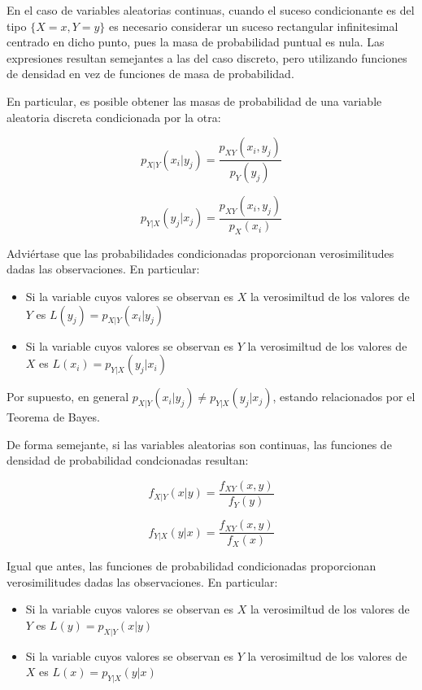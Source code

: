\documentclass[11pt]{article}
\providecommand{\tightlist}{%
      \setlength{\itemsep}{0pt}\setlength{\parskip}{0pt}}
\begin{document}
En el caso de variables aleatorias continuas, cuando el suceso
condicionante es del tipo \(\{X=x, Y=y\}\) es necesario considerar un
suceso rectangular infinitesimal centrado en dicho punto, pues la masa
de probabilidad puntual es nula. Las expresiones resultan semejantes a
las del caso discreto, pero utilizando funciones de densidad en vez de
funciones de masa de probabilidad.

    En particular, es posible obtener las masas de probabilidad de una
variable aleatoria discreta condicionada por la otra:

\[p_{X | Y}(x_i | y_j)=\frac{p_{XY}(x_i,y_j)}{p_Y(y_j)}\]

\[p_{Y|X}(y_j | x_j)=\frac{p_{XY}(x_i,y_j)}{p_X(x_i)}\]

Adviértase que las probabilidades condicionadas proporcionan
verosimilitudes dadas las observaciones. En particular:

\begin{itemize}
\tightlist
\item
  Si la variable cuyos valores se observan es \(X\) la verosimiltud de
  los valores de \(Y\) es \(L(y_j)=p_{X | Y}(x_i | y_j)\)
\item
  Si la variable cuyos valores se observan es \(Y\) la verosimiltud de
  los valores de \(X\) es \(L(x_i)=p_{Y | X}(y_j | x_i)\)
\end{itemize}

Por supuesto, en general
\(p_{X | Y}(x_i | y_j) \neq p_{Y | X}(y_j | x_j)\), estando relacionados
por el Teorema de Bayes.

    De forma semejante, si las variables aleatorias son continuas, las
funciones de densidad de probabilidad condcionadas resultan:

\[f_{X | Y}(x | y)=\frac{f_{XY}(x,y)}{f_Y(y)}\]

\[f_{Y | X}(y | x)=\frac{f_{XY}(x,y)}{f_X(x)}\]

Igual que antes, las funciones de probabilidad condicionadas
proporcionan verosimilitudes dadas las observaciones. En particular:

\begin{itemize}
\tightlist
\item
  Si la variable cuyos valores se observan es \(X\) la verosimiltud de
  los valores de \(Y\) es \(L(y)=p_{X | Y}(x | y)\)
\item
  Si la variable cuyos valores se observan es \(Y\) la verosimiltud de
  los valores de \(X\) es \(L(x)=p_{Y | X}(y | x)\)
\end{itemize}
\end{document}
